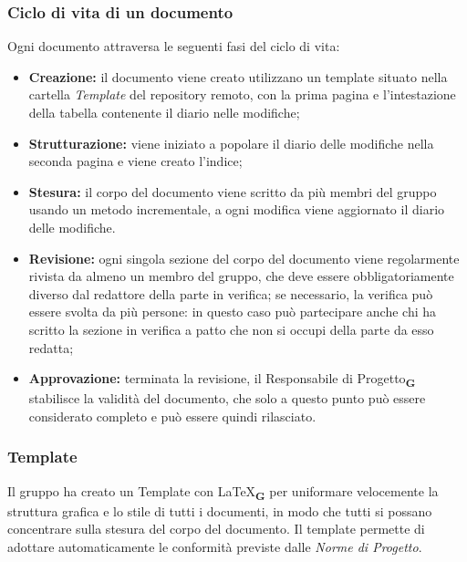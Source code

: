        \subsubsection{Ciclo di vita di un documento}
        Ogni documento attraversa le seguenti fasi del ciclo di vita:
        \begin{itemize}
            \item \textbf{Creazione:} il documento viene creato utilizzano un template situato nella cartella \textit{Template} del repository remoto, con la prima pagina e l'intestazione della tabella contenente il diario nelle modifiche;
            \item \textbf{Strutturazione:} viene iniziato a popolare il diario delle modifiche nella seconda pagina e viene creato l'indice;
            \item \textbf{Stesura:} il corpo del documento viene scritto da più membri del gruppo usando un metodo incrementale, a ogni modifica viene aggiornato il diario delle modifiche.
            \item \textbf{Revisione:} ogni singola sezione del corpo del documento viene regolarmente rivista da almeno un membro del gruppo, che deve essere obbligatoriamente diverso dal redattore della parte in verifica; se necessario, la verifica può essere svolta da più persone: in questo caso può partecipare anche chi ha scritto la sezione in verifica a patto che non si occupi della parte da esso redatta;
            \item \textbf{Approvazione:} terminata la revisione, il Responsabile di Progetto\textsubscript{\textbf{G}} stabilisce la validità del documento, che solo a questo punto può essere considerato completo e può essere quindi rilasciato.
        \end{itemize}
        \subsubsection{Template}
        Il gruppo ha creato un Template con \LaTeX\textsubscript{\textbf{G}} per uniformare velocemente la struttura grafica e lo stile di tutti i documenti, in modo che tutti si possano concentrare sulla stesura del corpo del documento. Il template permette di adottare automaticamente le conformità previste dalle \textit{Norme di Progetto}.
